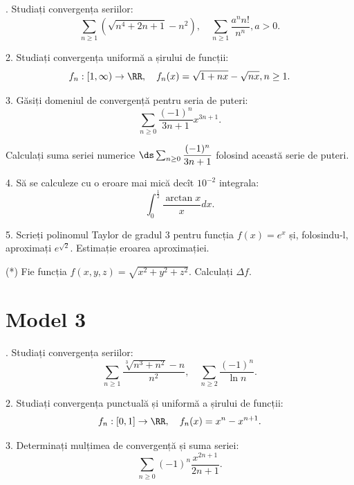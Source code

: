 \indent{}. Studiați convergența seriilor:
\[
  \sum_{n \geq 1} (\sqrt{n^4 + 2n + 1} - n^2), \quad %
  \sum_{n \geq 1} \frac{a^n n!}{n^n}, a > 0.
\]

\vspace{1cm}

2. Studiați convergența uniformă a șirului de funcții:
\[
  f_n : [1, \infty) \to \RR, \quad f_n(x) = \sqrt{1 + nx} - \sqrt{nx}, n \geq 1.
\]

\vspace{1cm}

3. Găsiți domeniul de convergență pentru seria de puteri:
\[
  \sum_{n \geq 0} \frac{(-1)^n}{3n + 1} x^{3n + 1}.
\]

Calculați suma seriei numerice $ \ds\sum_{n \geq 0} \dfrac{(-1)^n}{3n+1} $
folosind această serie de puteri.

\vspace{1cm}

4. Să se calculeze cu o eroare mai mică decît $ 10^{-2} $ integrala:
\[
  \int_0^{\frac{1}{2}} \frac{\arctan x}{x} dx.
\]

\vspace{1cm}

5. Scrieți polinomul Taylor de gradul 3 pentru funcția $ f(x) = e^x $
și, folosindu-l, aproximați $ e^{\sqrt{2}} $. Estimație eroarea aproximației.

\vspace{1cm}

(*) Fie funcția $ f(x, y, z) = \sqrt{x^2 + y^2 + z^2} $. Calculați $ \Delta f $.


\section{Model 3}

\indent{}. Studiați convergența seriilor:
\[
  \sum_{n \geq 1} \frac{\sqrt[3]{n^3 + n^2} - n}{n^2}, \quad %
  \sum_{n \geq 2} \frac{(-1)^n}{\ln n}.
\]

\vspace{1cm}

2. Studiați convergența punctuală și uniformă a șirului de funcții:
\[
  f_n : [0, 1] \to \RR, \quad f_n(x) = x^n - x^{n + 1}.
\]

\vspace{1cm}

3. Determinați mulțimea de convergență și suma seriei:
\[
  \sum_{n \geq 0} (-1)^n \frac{x^{2n+1}}{2n + 1}.
\]

